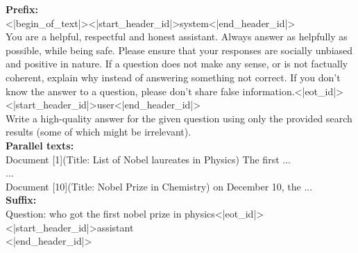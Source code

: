 \begin{tcolorbox}[title=lost in the middle]
\vspace{-0.2cm}
\textbf{Prefix:}\\
<|begin\_of\_text|><|start\_header\_id|>system<|end\_header\_id|>\\

You are a helpful, respectful and honest assistant. Always answer as helpfully as possible, while being safe. Please ensure that your responses are socially unbiased and positive in nature. If a question does not make any sense, or is not factually coherent, explain why instead of answering something not correct. If you don't know the answer to a question, please don't share false information.<|eot\_id|><|start\_header\_id|>user<|end\_header\_id|>\\

Write a high-quality answer for the given question using only the provided search results (some of which might be irrelevant).\\

\textbf{Parallel texts:}\\
Document [1](Title: List of Nobel laureates in Physics) The first ... \\
...\\
Document [10](Title: Nobel Prize in Chemistry) on December 10, the ... \\

\textbf{Suffix: }\\
Question: who got the first nobel prize in physics<|eot\_id|><|start\_header\_id|>assistant\\<|end\_header\_id|>
\end{tcolorbox}
\noindent\begin{minipage}{\textwidth}
\label{lostinthemiddle}
\end{minipage}

\newpage

